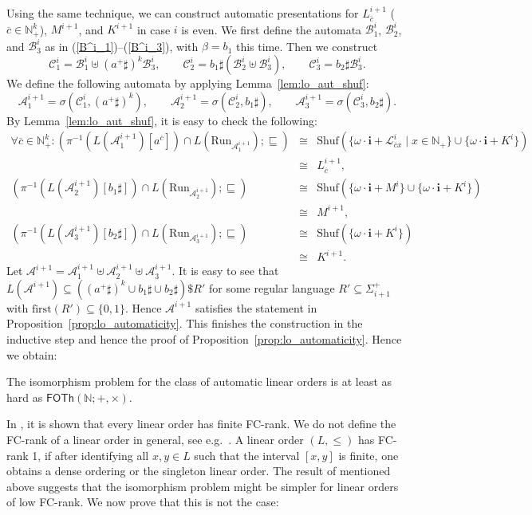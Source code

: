 \documentclass[envcountsame]{llncs}
\newcommand{\A}{\mathcal A}
\newcommand{\B}{\mathcal B}
\newcommand{\C}{\mathcal C}
\newcommand{\first}{\mathrm{first}}
\newcommand{\FOTh}{\mathsf{FOTh}}
\renewcommand{\L}{\mathcal L}
\newcommand{\N}{\mathbb N}
\renewcommand{\L}{\mathcal L}
\newcommand{\Run}{\mathrm{Run}}
\newcommand{\Shuf}{\mathrm{Shuf}}
\begin{document}
Using the same technique,  we can construct 
automatic presentations for  $L^{i+1}_{\overline{c}}$ ($\overline{c}\in
\N^{k}_+$), $M^{i+1}$, and $K^{i+1}$ in case $i$ is even.
We first define the automata $\B^{i}_1$, $\B^{i}_2$, and $\B^{i}_3$
as in (\ref{B^i_1})--(\ref{B^i_3}), with $\beta = b_1$ this time.
Then we construct
\[
    \C^{i}_1 =  \B^{i}_1 \uplus (a^+\sharp)^{k} \B^{i}_3, \qquad 
    \C^{i}_2 = b_1\sharp (\B^{i}_2 \uplus \B^{i}_3), \qquad 
    \C^{i}_3 = b_2\sharp \B^i_3.
\]
We define the following automata by applying Lemma~\ref{lem:lo_aut_shuf}:
\[
    \A^{i+1}_1 =  \sigma(\C^{i}_1, (a^+\sharp)^{k}), \qquad 
    \A^{i+1}_2 = \sigma(\C^{i}_2,b_1\sharp), \qquad 
    \A^{i+1}_3 = \sigma(\C^{i}_3,b_2\sharp).
\]
By Lemma~\ref{lem:lo_aut_shuf}, it is easy to check the following:
\begin{eqnarray*}
\forall \overline{c}\in \N^{k}_+: (\pi^{-1}(L(\A^{i+1}_1)[a^{\overline{c}}])
\cap L(\Run_{\A^{i+1}_1}); \sqsubseteq) & \cong & 
\Shuf(\{\omega\cdot \mathbf{i}+\L^{i}_{\overline{c}x} \mid x\in \N_+\} \cup
\{\omega\cdot \mathbf{i} + K^{i}\})\\
& \cong & L^{i+1}_{\overline{c}}, \\
(\pi^{-1}(L(\A^{i+1}_2)[b_1\sharp]) \cap L(\Run_{\A^{i+1}_2}); \sqsubseteq) &
\cong & \Shuf(\{\omega\cdot \mathbf{i}+M^{i}\} \cup \{\omega\cdot \mathbf{i}+K^{i}\} ) \\
& \cong & M^{i+1}, \\
(\pi^{-1}(L(\A^{i+1}_3)[b_2\sharp]) \cap L(\Run_{\A^{i+1}_3}); \sqsubseteq) &
\cong & \Shuf(\{\omega\cdot \mathbf{i}+K^{i}\}) \\
& \cong & K^{i+1} .
\end{eqnarray*}
Let $\A^{i+1}=\A^{i+1}_1\uplus \A^{i+1}_2\uplus \A^{i+1}_3$. 
It is easy to see that $L(\A^{i+1})\subseteq ((a^+\sharp)^{k}\cup b_1\sharp
\cup b_2\sharp) \$ R'$ for some regular language $R' \subseteq \Sigma_{i+1}^+$
with $\first(R') \subseteq \{0,1\}$. 
Hence $\A^{i+1}$ satisfies the statement in
Proposition~\ref{prop:lo_automaticity}. 
This finishes the construction in the inductive step and hence 
the proof of Proposition~\ref{prop:lo_automaticity}.   Hence we obtain:

\begin{theorem}\label{thm:lo}
  The isomorphism problem for the class of automatic linear orders is at least as hard as 
  $\FOTh(\N;+,\times)$.
\end{theorem} 
In \cite{KhoRS05}, it is shown that every linear order has finite
FC-rank. We do not define the FC-rank of a linear order in general, see e.g.\ 
\cite{KhoRS05}. A linear order $(L,\leq)$ has FC-rank 1, if after identifying all
$x,y \in L$ such that the interval $[x,y]$ is finite, one obtains a dense
ordering or the singleton linear order.
The result of \cite{KhoRS05} mentioned above 
suggests that the isomorphism problem might be
simpler for linear orders of low FC-rank. We now prove that this is
not the case:
\end{document}
